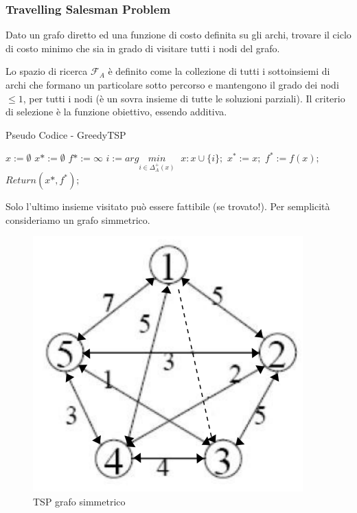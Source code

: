 \documentclass{article}
\begin{document}
    \subsubsection{Travelling Salesman Problem}
    Dato un grafo diretto ed una funzione di costo definita su gli archi, trovare il ciclo di costo
    minimo che sia in grado di visitare tutti i nodi del grafo.

    Lo spazio di ricerca $\mathcal{F}_A$ è definito come la collezione di tutti i sottoinsiemi di archi che
    formano un particolare sotto percorso e mantengono il grado dei nodi $\leq 1$, per tutti i nodi (è
    un sovra insieme di tutte le soluzioni parziali).
    Il criterio di selezione è la funzione obiettivo, essendo additiva.

    \begin{algorithm}[H]
        \caption{Pseudo Codice - GreedyTSP}
        \begin{algorithmic}
            \State $x:=\emptyset$
            \State $x*:=\emptyset$
            \State $f*:=\infty$
            \State $i:=arg\underset{i \in \Delta_A^+(x)}{min}\;$
            \State $x:x\cup\{i\};$
            \EndWhile
            \State $x^*:=x;$
            \State $f^*:=f(x);$
            \EndIf
            \State $Return(x*,f^*);$
        \end{algorithmic}
    \end{algorithm}
    Solo l'ultimo insieme visitato può essere fattibile (se trovato!).
    Per semplicità consideriamo un grafo simmetrico.
    \begin{figure}[H]
        \centering
        \includegraphics[scale=0.5]{images/TSP_simm.png}
        \caption{TSP grafo simmetrico}
    \end{figure}
\end{document}

